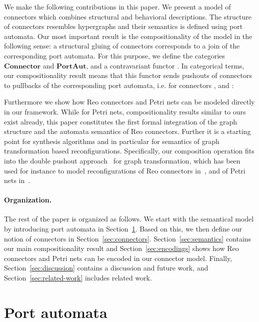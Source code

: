 \documentclass[copyright,creativecommons]{eptcs}
\newcommand{\PA}{\ensuremath{\mathbf{PortAut}}}
\newcommand{\Connector}{\ensuremath{\mathbf{Connector}}}
\begin{document}
We make the following contributions in this paper. We present
a model of connectors which combines 
structural and behavioral descriptions.
The structure of connectors resembles hypergraphs and their
semantics is defined using port automata. 
Our most important result is the compositionality of the model 
in the following sense: a structural gluing of connectors 
corresponds to a join of the corresponding port automata.
For this purpose, we define the categories {\Connector} and 
{\PA}, and a contravariant functor .
In categorical terms, our compositionality result means that this
functor sends pushouts of connectors to pullbacks of the 
corresponding port automata, i.e. for connectors ,  and
:

Furthermore we show how Reo connectors and Petri nets can be modeled
directly in our framework. While for Petri nets, compositionality results 
similar to ours exist already, this paper constitutes the first 
formal integration of the graph structure and the automata semantics 
of Reo connectors. Further it is a starting point for synthesis 
algorithms and in particular for semantics of graph transformation 
based reconfigurations.  Specifically, our composition operation fits into the 
double pushout approach~\cite{DPO,EEPT06} for graph transformation,
which has been used for instance to model reconfigurations 
of Reo connectors in~\cite{KMLA10}, and of Petri nets 
in~\cite{PER01}.


\paragraph{Organization.} The rest of the paper is organized
as follows. We start with the semantical model by introducing
port automata in Section~\ref{sec:port-automata}. Based on this,
we then define our notion of connectors in Section~\ref{sec:connectors}.
Section~\ref{sec:semantics} contains our main compositionality
result and Section~\ref{sec:encodings} shows how Reo connectors
and Petri nets can be encoded in our connector model.
Finally, Section~\ref{sec:discussion} contains a discussion and 
future work, and Section~\ref{sec:related-work} includes related work.



 
\vspace{0.5cm}
\section{Port automata}
\label{sec:port-automata}
\end{document}
